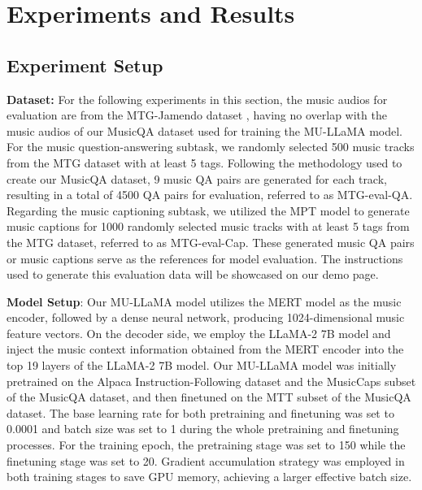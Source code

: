 \documentclass{article}
\begin{document}
\vspace{-0.2cm}
\section{Experiments and Results}
\label{sec:experiments}



\subsection{Experiment Setup}

\noindent
\textbf{Dataset:} For the following experiments in this section, the music audios for evaluation are from the MTG-Jamendo dataset \cite{bogdanov2019mtg}, having no overlap with the music audios of our MusicQA dataset used for training the MU-LLaMA model. For the music question-answering subtask, we randomly selected 500 music tracks from the MTG dataset with at least 5 tags. Following the methodology used to create our MusicQA dataset, 9 music QA pairs are generated for each track, resulting in a total of 4500 QA pairs for evaluation, referred to as MTG-eval-QA. Regarding the music captioning subtask, we utilized the MPT model \cite{MosaicML2023Introducing} to generate music captions for 1000 randomly selected music tracks with at least 5 tags from the MTG dataset, referred to as MTG-eval-Cap. These generated music QA pairs or music captions serve as the references for model evaluation. The instructions used to generate this evaluation data will be showcased on our demo page.

\noindent
\textbf{Model Setup}: Our MU-LLaMA model utilizes the MERT model as the music encoder, followed by a dense neural network, producing 1024-dimensional music feature vectors. On the decoder side, we employ the LLaMA-2 7B model \cite{touvron2023llama2} and inject the music context information obtained from the MERT encoder into the top 19 layers  of the LLaMA-2 7B model. Our MU-LLaMA model was initially pretrained on the Alpaca Instruction-Following dataset and the MusicCaps subset of the MusicQA dataset, and then finetuned on the MTT subset of the MusicQA dataset. The base learning rate for both pretraining and finetuning was set to 0.0001 and batch size was set to 1 during the whole pretraining and finetuning processes. For the training epoch, the pretraining stage was set to 150 while the finetuning stage was set to 20. Gradient accumulation strategy was employed in both training stages to save GPU memory, achieving a larger effective batch size.
\end{document}

